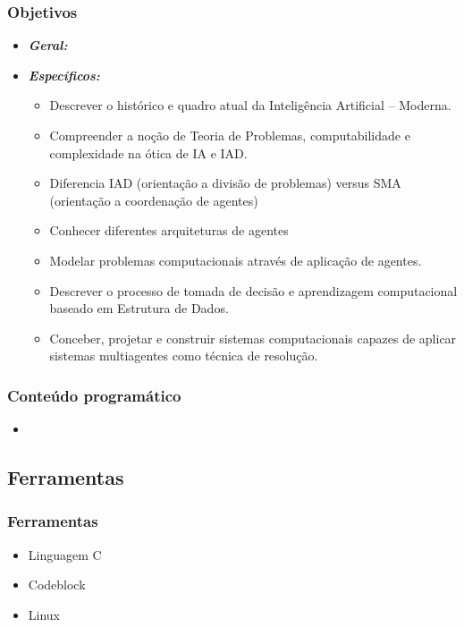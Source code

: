 \begin{frame} [allowframebreaks=0.9]
\frametitle{Objetivos}

\begin{itemize}
\item \emph{\textbf{Geral:}} 
 

\newpage
\item \emph{\textbf{Específicos:}} 

  \begin{itemize}
  \item Descrever o histórico e quadro atual da Inteligência Artificial -- Moderna. 
  \item Compreender a noção de Teoria de Problemas, computabilidade e complexidade na ótica de IA e IAD.
  \item Diferencia IAD (orientação a divisão de problemas) versus SMA (orientação a 
  coordenação de agentes)
  \item  Conhecer diferentes arquiteturas de agentes
  \item   Modelar problemas computacionais através de aplicação de agentes.
  \item   Descrever o processo de tomada de decisão e aprendizagem computacional baseado em 
  Estrutura de Dados.
  \item   Conceber, projetar e construir sistemas computacionais capazes de aplicar sistemas 
  multiagentes como técnica de resolução.
  
  \end{itemize}

\end{itemize}

\end{frame}



\begin{frame}
\frametitle{Conteúdo programático}


    \begin{itemize}
      \item 
      
    \end{itemize}
\end{frame}



\subsection{Ferramentas}
\begin{frame}

    \frametitle{Ferramentas}

    \begin{itemize}
      \item Linguagem C
      \item Codeblock
      \item Linux
      
    \end{itemize}
\end{frame}

